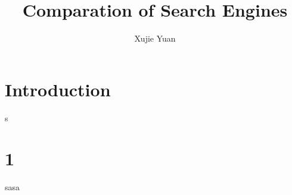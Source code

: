 \documentclass[UTF8]{article}
\title{Comparation of Search Engines}
\author{Xujie Yuan}
\begin{document}
    \maketitle
    \section{Introduction}
    s
    \section{1}
    sasa
\end{document}
